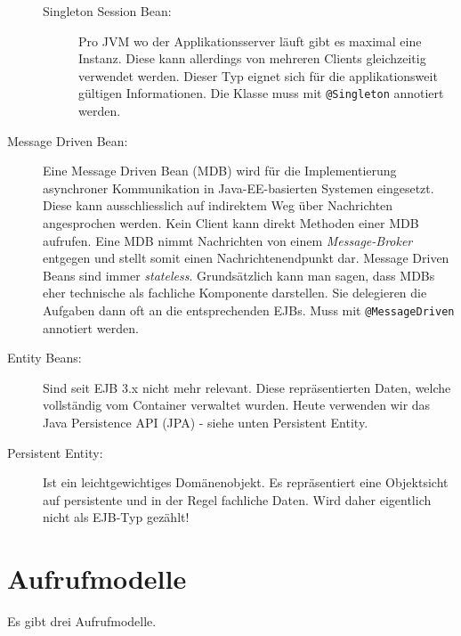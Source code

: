\begin{description}
\begin{description}
			\item[Singleton Session Bean:] Pro JVM wo der Applikationsserver läuft gibt es maximal eine Instanz. Diese kann allerdings von mehreren Clients gleichzeitig verwendet werden. Dieser Typ eignet sich für die applikationsweit gültigen Informationen. Die Klasse muss mit \verb|@Singleton| annotiert werden.
		\end{description}
	
	\item[Message Driven Bean:] Eine Message Driven Bean (MDB) wird für die Implementierung asynchroner Kommunikation in Java-EE-basierten Systemen eingesetzt. Diese kann ausschliesslich auf indirektem Weg über Nachrichten angesprochen werden. Kein Client kann direkt Methoden einer MDB aufrufen. Eine MDB nimmt Nachrichten von einem \emph{Message-Broker} entgegen und stellt somit einen Nachrichtenendpunkt dar. Message Driven Beans sind immer \emph{stateless}. Grundsätzlich kann man sagen, dass MDBs eher technische als fachliche Komponente darstellen. Sie delegieren die Aufgaben dann oft an die entsprechenden EJBs. Muss mit \verb|@MessageDriven| annotiert werden.
	
	\item[Entity Beans:] Sind seit EJB 3.x nicht mehr relevant. Diese repräsentierten Daten, welche vollständig vom Container verwaltet wurden. Heute verwenden wir das Java Persistence API (JPA) - siehe unten Persistent Entity.
		
	\item[Persistent Entity:] Ist ein leichtgewichtiges Domänenobjekt. Es repräsentiert eine Objektsicht auf persistente und in der Regel fachliche Daten. Wird daher eigentlich nicht als EJB-Typ gezählt!
\end{description}

\section{Aufrufmodelle}
Es gibt drei Aufrufmodelle.

